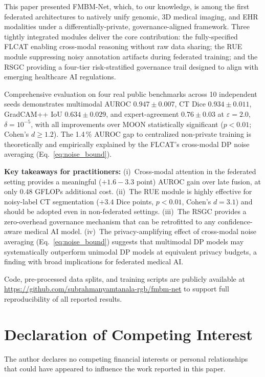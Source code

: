 \documentclass[a4paper,fleqn]{cas-dc}
\begin{document}
This paper presented FMBM-Net, which, to our knowledge, is among the first
federated architectures to natively unify genomic, 3D medical imaging, and
EHR modalities under a differentially-private, governance-aligned framework.
Three tightly integrated modules deliver the core contribution: the
fully-specified FLCAT enabling cross-modal reasoning without raw data sharing;
the RUE module suppressing noisy annotation artifacts during federated training;
and the RSGC providing a four-tier risk-stratified governance trail designed
to align with emerging healthcare AI regulations.

Comprehensive evaluation on four real public benchmarks across 10 independent
seeds demonstrates multimodal AUROC $0.947\!\pm\!0.007$, CT Dice
$0.934\!\pm\!0.011$, GradCAM++ IoU $0.634\!\pm\!0.029$, and expert-agreement
$0.76\!\pm\!0.03$ at $\varepsilon\!=\!2.0$, $\delta\!=\!10^{-5}$, with all
improvements over MOON statistically significant
($p\!<\!0.01$; Cohen's $d\!\geq\!1.2$). The 1.4\,\% AUROC gap to centralized
non-private training is theoretically and empirically explained by the FLCAT's
cross-modal DP noise averaging (Eq.~\ref{eq:noise_bound}).

\textbf{Key takeaways for practitioners:}
(i)~Cross-modal attention in the federated setting provides a meaningful
($+1.6\!-\!3.3$ point) AUROC gain over late fusion, at only 0.48 GFLOPs
additional cost. (ii)~The RUE module is highly effective for noisy-label CT
segmentation ($+3.4$ Dice points, $p\!<\!0.01$, Cohen's $d\!=\!3.1$) and
should be adopted even in non-federated settings. (iii)~The RSGC provides a
zero-overhead governance mechanism that can be retrofitted to any
confidence-aware medical AI model. (iv)~The privacy-amplifying effect of
cross-modal noise averaging (Eq.~\ref{eq:noise_bound}) suggests that multimodal
DP models may systematically outperform unimodal DP models at equivalent
privacy budgets, a finding with broad implications for federated medical AI.

Code, pre-processed data splits, and training scripts are publicly available
at \url{https://github.com/subrahmanyamtanala-rgb/fmbm-net} to support full
reproducibility of all reported results.

\section*{Declaration of Competing Interest}
The author declares no competing financial interests or personal relationships
that could have appeared to influence the work reported in this paper.
\end{document}

